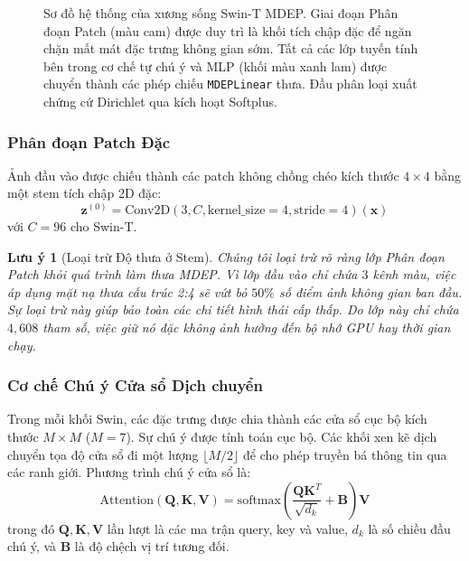 \documentclass[11pt]{article}
\newtheorem{remark}{Lưu ý}
\begin{document}
\begin{figure}[H]
\caption{Sơ đồ hệ thống của xương sống Swin-T MDEP. Giai đoạn Phân đoạn Patch (màu cam) được duy trì là khối tích chập đặc để ngăn chặn mất mát đặc trưng không gian sớm. Tất cả các lớp tuyến tính bên trong cơ chế tự chú ý và MLP (khối màu xanh lam) được chuyển thành các phép chiếu \texttt{MDEPLinear} thưa. Đầu phân loại xuất chứng cứ Dirichlet qua kích hoạt Softplus.}
\label{fig:swin_arch}
\end{figure}

\subsubsection{Phân đoạn Patch Đặc}

Ảnh đầu vào được chiếu thành các patch không chồng chéo kích thước $4 \times 4$ bằng một stem tích chập 2D đặc:
\begin{equation}\label{eq:patch_partition}
    \bm{z}^{(0)} = \text{Conv2D}(3, C, \text{kernel\_size}=4, \text{stride}=4)(\bm{x})
\end{equation}
với $C=96$ cho Swin-T.

\begin{remark}[Loại trừ Độ thưa ở Stem]
Chúng tôi loại trừ rõ ràng lớp Phân đoạn Patch khỏi quá trình làm thưa MDEP. Vì lớp đầu vào chỉ chứa $3$ kênh màu, việc áp dụng mặt nạ thưa cấu trúc 2:4 sẽ vứt bỏ $50\%$ số điểm ảnh không gian ban đầu. Sự loại trừ này giúp bảo toàn các chi tiết hình thái cấp thấp. Do lớp này chỉ chứa $4{,}608$ tham số, việc giữ nó đặc không ảnh hưởng đến bộ nhớ GPU hay thời gian chạy.
\end{remark}

\subsubsection{Cơ chế Chú ý Cửa sổ Dịch chuyển}

Trong mỗi khối Swin, các đặc trưng được chia thành các cửa sổ cục bộ kích thước $M \times M$ ($M=7$). Sự chú ý được tính toán cục bộ. Các khối xen kẽ dịch chuyển tọa độ cửa sổ đi một lượng $\lfloor M/2 \rfloor$ để cho phép truyền bá thông tin qua các ranh giới. Phương trình chú ý cửa sổ là:
\begin{equation}\label{eq:attention}
    \text{Attention}(\bm{Q}, \bm{K}, \bm{V}) = \text{softmax}\!\left(\frac{\bm{Q}\bm{K}^T}{\sqrt{d_k}} + \bm{B}\right)\bm{V}
\end{equation}
trong đó $\bm{Q}, \bm{K}, \bm{V}$ lần lượt là các ma trận query, key và value, $d_k$ là số chiều đầu chú ý, và $\bm{B}$ là độ chệch vị trí tương đối.
\end{document}
